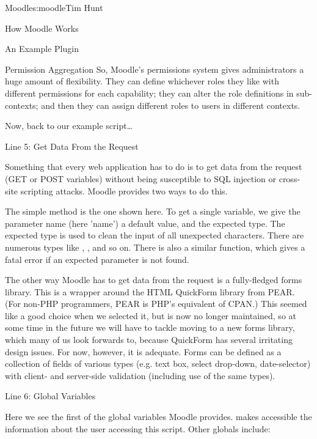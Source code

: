 \begin{aosachapter}{Moodle}{s:moodle}{Tim Hunt}
\begin{aosasect1}{How Moodle Works}
\begin{aosasect2}{An Example Plugin}
\begin{aosasect3}{Permission Aggregation}
So, Moodle's permissions system gives administrators a huge amount of
flexibility. They can define whichever roles they like with different
permissions for each capability; they can alter the role definitions
in sub-contexts; and then they can assign different roles to users in
different contexts.

Now, back to our example script{\ldots}

\end{aosasect3}

\begin{aosasect3}{Line 5: Get Data From the Request}

Something that every web application has to do is to get data from the
request (GET or POST variables) without being susceptible to SQL
injection or cross-site scripting attacks. Moodle provides two ways to
do this.

The simple method is the one shown here. To get a single variable, we
give the parameter name (here 'name') a default value, and the
expected type. The expected type is used to clean the input of all
unexpected characters. There are numerous types like
, ,  and so
on.  There is also a similar  function, which
gives a fatal error if an expected parameter is not found.

The other way Moodle has to get data from the request is a
fully-fledged forms library. This is a wrapper around the HTML
QuickForm library from PEAR. (For non-PHP programmers, PEAR is PHP's
equivalent of CPAN.) This seemed like a good choice when we selected
it, but is now no longer maintained, so at some time in the future we
will have to tackle moving to a new forms library, which many of us
look forwards to, because QuickForm has several irritating design
issues. For now, however, it is adequate. Forms can be defined as a
collection of fields of various types (e.g. text box, select
drop-down, date-selector) with client- and server-side validation
(including use of the same  types).

\end{aosasect3}

\begin{aosasect3}{Line 6: Global Variables}

Here we see the first of the global variables Moodle
provides.  makes accessible the information about the
user accessing this script. Other globals include:

\begin{aosaitemize}


\end{aosaitemize}
\end{aosasect3}
\end{aosasect2}
\end{aosasect1}
\end{aosachapter}
